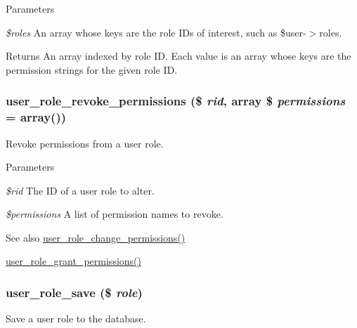 \begin{DoxyParams}{Parameters}
\item[{\em \$roles}]An array whose keys are the role IDs of interest, such as \$user-\/$>$roles.\end{DoxyParams}
\begin{DoxyReturn}{Returns}
An array indexed by role ID. Each value is an array whose keys are the permission strings for the given role ID. 
\end{DoxyReturn}
\hypertarget{user_8module_a5b4cb135247dfac81c93c8da05bcd514}{
\subsubsection[{user\_\-role\_\-revoke\_\-permissions}]{\setlength{\rightskip}{0pt plus 5cm}user\_\-role\_\-revoke\_\-permissions (\$ {\em rid}, \/  array \$ {\em permissions} = {\ttfamily array()})}}
\label{user_8module_a5b4cb135247dfac81c93c8da05bcd514}
Revoke permissions from a user role.


\begin{DoxyParams}{Parameters}
\item[{\em \$rid}]The ID of a user role to alter. \item[{\em \$permissions}]A list of permission names to revoke.\end{DoxyParams}
\begin{DoxySeeAlso}{See also}
\hyperlink{user_8module_a99fd9206a99c083a3f7ee09ba0c4a9ea}{user\_\-role\_\-change\_\-permissions()} 

\hyperlink{user_8module_aee75b0b96b7cec455cb0245275469aaf}{user\_\-role\_\-grant\_\-permissions()} 
\end{DoxySeeAlso}
\hypertarget{user_8module_a4585f9898ea037730af8f3e6289c158d}{
\subsubsection[{user\_\-role\_\-save}]{\setlength{\rightskip}{0pt plus 5cm}user\_\-role\_\-save (\$ {\em role})}}
\label{user_8module_a4585f9898ea037730af8f3e6289c158d}
Save a user role to the database.


